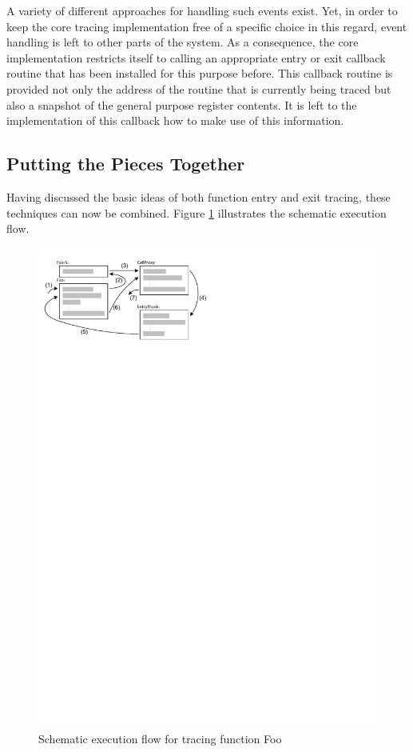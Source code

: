 A variety of different approaches for handling such events exist. Yet, in order
to keep the core tracing implementation free of a specific choice in this regard,
event handling is left to other parts of the system. As a consequence, 
the core implementation restricts itself to calling an appropriate entry or exit callback
routine that has been installed for this purpose before. This callback routine is provided
not only the address of the routine that is currently being traced but also
a snapshot of the general purpose register contents. It is left to
the implementation of this callback how to make use of this information.

\subsection{Putting the Pieces Together}
Having discussed the basic ideas of both function entry and exit tracing, these
techniques can now be combined. Figure \ref{EntryExitTracingSketch} illustrates
the schematic execution flow.

\begin{figure}[htbp] 
\begin{centering} 
\includegraphics[scale=1, clip=true, viewport=0cm 24cm 11cm 30cm]{images/diagrams/EntryExitTracingSketch.pdf} 
\caption{Schematic execution flow for tracing function Foo} 
\label{EntryExitTracingSketch} 
\end{centering} 
\end{figure}

